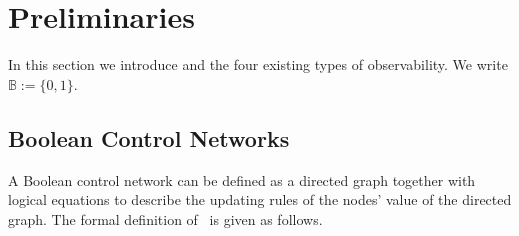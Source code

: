 \section{Preliminaries} 
\label{sec:pre}
In this section we introduce {\BCNs} and the four existing types of observability. 
We write $\mathbb{B}:=\{0,1\}$. %

\subsection{Boolean Control Networks}

A Boolean control network can be defined as a directed graph together with logical equations to describe the updating rules of the nodes' value of the directed graph. The formal definition of \BCN\ is given as follows. 

